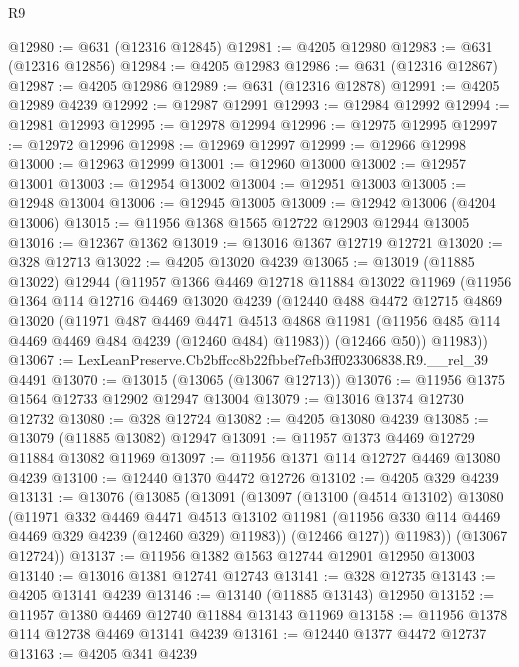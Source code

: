 \begin{lexlean}{R9}
\begin{coremodule}
@12980 := @631 (@12316 @12845)
@12981 := @4205 @12980
@12983 := @631 (@12316 @12856)
@12984 := @4205 @12983
@12986 := @631 (@12316 @12867)
@12987 := @4205 @12986
@12989 := @631 (@12316 @12878)
@12991 := @4205 @12989 @4239
@12992 := @12987 @12991
@12993 := @12984 @12992
@12994 := @12981 @12993
@12995 := @12978 @12994
@12996 := @12975 @12995
@12997 := @12972 @12996
@12998 := @12969 @12997
@12999 := @12966 @12998
@13000 := @12963 @12999
@13001 := @12960 @13000
@13002 := @12957 @13001
@13003 := @12954 @13002
@13004 := @12951 @13003
@13005 := @12948 @13004
@13006 := @12945 @13005
@13009 := @12942 @13006 (@4204 @13006)
@13015 := @11956 @1368 @1565 @12722 @12903 @12944 @13005
@13016 := @12367 @1362
@13019 := @13016 @1367 @12719 @12721
@13020 := @328 @12713
@13022 := @4205 @13020 @4239
@13065 := @13019
    (@11885 @13022)
    @12944
    (@11957
      @1366
      @4469
      @12718
      @11884
      @13022
      @11969
      (@11956
        @1364
        @114
        @12716
        @4469
        @13020
        @4239
        (@12440
          @488
          @4472
          @12715
          @4869
          @13020
          (@11971
            @487
            @4469
            @4471
            @4513
            @4868
            @11981
            (@11956 @485 @114 @4469 @4469 @484 @4239 (@12460 @484) @11983))
          (@12466 @50))
        @11983))
@13067 := LexLeanPreserve.Cb2bffcc8b22fbbef7efb3ff023306838.R9.__rel_39 @4491
@13070 := @13015 (@13065 (@13067 @12713))
@13076 := @11956 @1375 @1564 @12733 @12902 @12947 @13004
@13079 := @13016 @1374 @12730 @12732
@13080 := @328 @12724
@13082 := @4205 @13080 @4239
@13085 := @13079 (@11885 @13082) @12947
@13091 := @11957 @1373 @4469 @12729 @11884 @13082 @11969
@13097 := @11956 @1371 @114 @12727 @4469 @13080 @4239
@13100 := @12440 @1370 @4472 @12726
@13102 := @4205 @329 @4239
@13131 := @13076
    (@13085
      (@13091
        (@13097
          (@13100
            (@4514 @13102)
            @13080
            (@11971
              @332
              @4469
              @4471
              @4513
              @13102
              @11981
              (@11956 @330 @114 @4469 @4469 @329 @4239 (@12460 @329) @11983))
            (@12466 @127))
          @11983))
      (@13067 @12724))
@13137 := @11956 @1382 @1563 @12744 @12901 @12950 @13003
@13140 := @13016 @1381 @12741 @12743
@13141 := @328 @12735
@13143 := @4205 @13141 @4239
@13146 := @13140 (@11885 @13143) @12950
@13152 := @11957 @1380 @4469 @12740 @11884 @13143 @11969
@13158 := @11956 @1378 @114 @12738 @4469 @13141 @4239
@13161 := @12440 @1377 @4472 @12737
@13163 := @4205 @341 @4239

\end{coremodule}
\end{lexlean}
